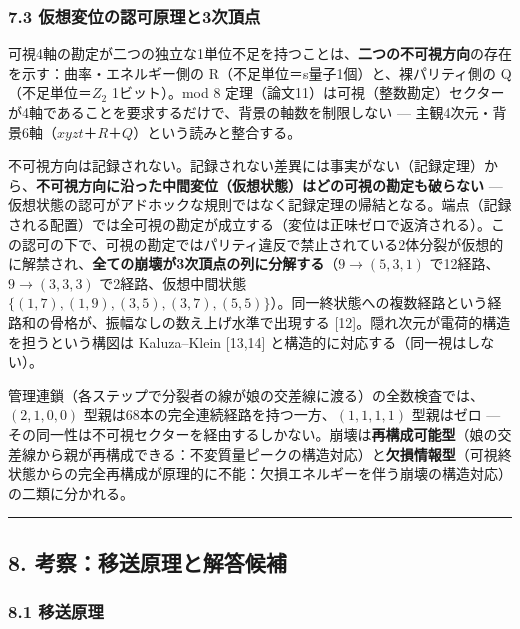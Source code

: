 \documentclass[
]{ltjsarticle}
\begin{document}
\subsubsection{7.3
仮想変位の認可原理と3次頂点}\label{ux4eeeux60f3ux5909ux4f4dux306eux8a8dux53efux539fux7406ux30683ux6b21ux9802ux70b9}

可視4軸の勘定が二つの独立な1単位不足を持つことは、\textbf{二つの不可視方向}の存在を示す：曲率・エネルギー側の
R（不足単位＝s量子1個）と、裸パリティ側の Q（不足単位＝\(Z_2\)
1ビット）。mod 8
定理（論文11）は可視（整数勘定）セクターが4軸であることを要求するだけで、背景の軸数を制限しない
--- 主観4次元・背景6軸（\(xyzt\)＋\(R\)＋\(Q\)）という読みと整合する。

不可視方向は記録されない。記録されない差異には事実がない（記録定理）から、\textbf{不可視方向に沿った中間変位（仮想状態）はどの可視の勘定も破らない}
---
仮想状態の認可がアドホックな規則ではなく記録定理の帰結となる。端点（記録される配置）では全可視の勘定が成立する（変位は正味ゼロで返済される）。この認可の下で、可視の勘定ではパリティ違反で禁止されている2体分裂が仮想的に解禁され、\textbf{全ての崩壊が3次頂点の列に分解する}（\(9\to(5,3,1)\)
で12経路、\(9\to(3,3,3)\) で2経路、仮想中間状態
\(\{(1,7),(1,9),(3,5),(3,7),(5,5)\}\)）。同一終状態への複数経路という経路和の骨格が、振幅なしの数え上げ水準で出現する
{[}12{]}。隠れ次元が電荷的構造を担うという構図は Kaluza--Klein
{[}13,14{]} と構造的に対応する（同一視はしない）。

管理連鎖（各ステップで分裂者の線が娘の交差線に渡る）の全数検査では、\((2,1,0,0)\)
型親は68本の完全連続経路を持つ一方、\((1,1,1,1)\) 型親はゼロ ---
その同一性は不可視セクターを経由するしかない。崩壊は\textbf{再構成可能型}（娘の交差線から親が再構成できる：不変質量ピークの構造対応）と\textbf{欠損情報型}（可視終状態からの完全再構成が原理的に不能：欠損エネルギーを伴う崩壊の構造対応）の二類に分かれる。

\begin{center}\rule{0.5\linewidth}{0.5pt}\end{center}

\subsection{8.
考察：移送原理と解答候補}\label{ux8003ux5bdfux79fbux9001ux539fux7406ux3068ux89e3ux7b54ux5019ux88dc}

\subsubsection{8.1 移送原理}\label{ux79fbux9001ux539fux7406}
\end{document}
